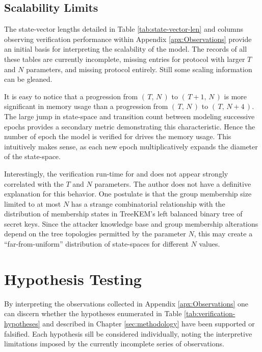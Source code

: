 \hypertarget{scalability-limits}{%
\subsection{Scalability Limits}\label{scalability-limits}}

The state-vector lengths detailed in Table \ref{tab:state-vector-len} and columns observing verification performance within Appendix \ref{apx:Observations} provide an initial basis for interpreting the scalability of the  model.
The records of all these tables are currently incomplete, missing entries for protocol \VersionOne with larger \(T\) and \(N\) parameters, and missing protocol \VersionTwo entirely.
Still some scaling information can be gleaned.

It is easy to notice that a progression from \( (\,T,\, N\,) \) to \( (\,T+1,\, N\,) \) is more significant in memory usage than a progression from \( (\,T,\, N\,) \) to \( (\,T,\, N+4\,) \).
The large jump in state-space and transition count between modeling successive epochs provides a secondary metric demonstrating this characteristic.
Hence the number of epoch the model is verified for drives the memory usage.
This intuitively makes sense, as each new epoch multiplicatively expands the diameter of the state-space.

Interestingly, the verification run-time for  and  does not appear strongly correlated with the \(T\) and \(N\) parameters.
The author does not have a definitive explanation for this behavior.
One postulate is that the group membership size limited to at most \(N\) has a strange combinatorial relationship with the distribution of membership states in TreeKEM's left balanced binary tree of secret keys.
Since the attacker knowledge base and group membership alterations depend on the tree topologies permitted by the parameter \(N\), this may create a ``far-from-uniform'' distribution of state-spaces for different \(N\) values.


\hypertarget{hypothesis-outcomes}{%
\section{Hypothesis Testing}\label{hypothesis-outcomes}}

By interpreting the observations collected in Appendix \ref{apx:Observations} one can discern whether the hypotheses enumerated in Table \ref{tab:verification-hypotheses} and described in Chapter \ref{sec:methodology} have been supported or falsified.
Each hypothesis sill be considered individually, noting the interpretive limitations imposed by the currently incomplete series of observations.


